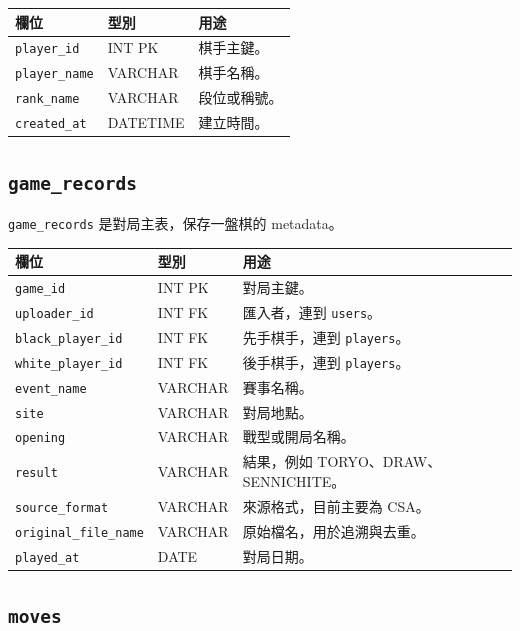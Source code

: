 \documentclass[12pt,a4paper,fontset=none]{ctexart}
\begin{document}
\begin{longtable}{p{}p{}p{}}
\toprule
\textbf{欄位} & \textbf{型別} & \textbf{用途}\\
\midrule
\endhead
\texttt{player\_id} & INT PK & 棋手主鍵。\\
\texttt{player\_name} & VARCHAR & 棋手名稱。\\
\texttt{rank\_name} & VARCHAR & 段位或稱號。\\
\texttt{created\_at} & DATETIME & 建立時間。\\
\bottomrule
\end{longtable}

\subsection{\texttt{game\_records}}

\texttt{game\_records} 是對局主表，保存一盤棋的 metadata。

\begin{longtable}{p{}p{}p{}}
\toprule
\textbf{欄位} & \textbf{型別} & \textbf{用途}\\
\midrule
\endhead
\texttt{game\_id} & INT PK & 對局主鍵。\\
\texttt{uploader\_id} & INT FK & 匯入者，連到 \texttt{users}。\\
\texttt{black\_player\_id} & INT FK & 先手棋手，連到 \texttt{players}。\\
\texttt{white\_player\_id} & INT FK & 後手棋手，連到 \texttt{players}。\\
\texttt{event\_name} & VARCHAR & 賽事名稱。\\
\texttt{site} & VARCHAR & 對局地點。\\
\texttt{opening} & VARCHAR & 戰型或開局名稱。\\
\texttt{result} & VARCHAR & 結果，例如 TORYO、DRAW、SENNICHITE。\\
\texttt{source\_format} & VARCHAR & 來源格式，目前主要為 CSA。\\
\texttt{original\_file\_name} & VARCHAR & 原始檔名，用於追溯與去重。\\
\texttt{played\_at} & DATE & 對局日期。\\
\bottomrule
\end{longtable}

\subsection{\texttt{moves}}
\end{document}
